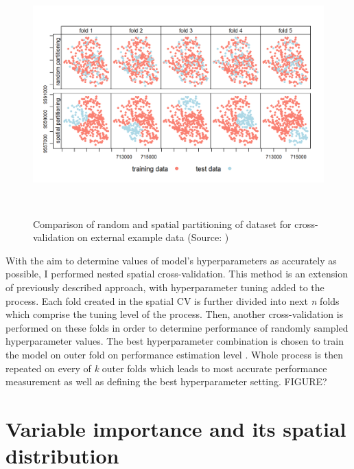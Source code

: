 \documentclass{amuthesis}
\begin{document}
\begin{figure}[H]

{\centering \includegraphics[width=5.9375in,height=3.64583in]{./figures/spatial_partitioning.png}

}

\caption{\label{fig-rycina5}Comparison of random and spatial
partitioning of dataset for cross-validation on external example data
(Source: \textcite{lovelace_geocomputation_2019})}

\end{figure}

With the aim to determine values of model's hyperparameters as
accurately as possible, I performed nested spatial cross-validation.
This method is an extension of previously described approach, with
hyperparameter tuning added to the process. Each fold created in the
spatial CV is further divided into next \emph{n} folds which comprise
the tuning level of the process. Then, another cross-validation is
performed on these folds in order to determine performance of randomly
sampled hyperparameter values. The best hyperparameter combination is
chosen to train the model on outer fold on performance estimation level
\autocite{schratz_hyperparameter_2019}. Whole process is then repeated
on every of \emph{k} outer folds which leads to most accurate
performance measurement as well as defining the best hyperparameter
setting. FIGURE?

\hypertarget{sec-importance}{%
\section{Variable importance and its spatial
distribution}\label{sec-importance}}
\end{document}
